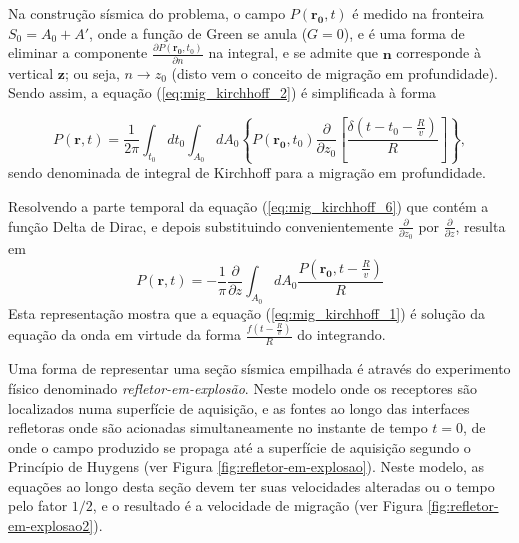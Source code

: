 Na construção sísmica do problema, o campo $P(\mathbf{r_0},t)$ é medido na fronteira $S_0 = A_0 + A'$, onde a função de Green se anula ($G = 0$), e é uma forma de eliminar a componente $\frac{\partial P(\mathbf{r_0},t_0)}{\partial n}$ na integral, e se admite que $\mathbf{n}$ corresponde à vertical $\mathbf{z}$; ou seja, $n\rightarrow z_0$ (disto vem o conceito de migração em profundidade). 
Sendo assim, a equação (\ref{eq:mig_kirchhoff_2}) é simplificada à forma

\begin{equation}
P(\mathbf{r},t)=\frac{1}{2\pi}\int_{t_0}dt_0\int_{A_0}dA_0\left\{P(\mathbf{r_0},t_0)\frac{\partial}{\partial z_0}\left[\frac{\delta (t-t_0-\frac{R}{v})}{R} \right]\right\},
\label{eq:mig_kirchhoff_6}
\end{equation}
sendo denominada de integral de Kirchhoff para a migração em profundidade. 

Resolvendo a parte temporal da equação (\ref{eq:mig_kirchhoff_6}) que contém a função Delta de Dirac, e depois substituindo convenientemente $\frac{\partial}{\partial z_0}$ por $\frac{\partial}{\partial z}$,  resulta em
\begin{equation}
P(\mathbf{r},t)=-\frac{1}{\pi}\frac{\partial}{\partial z}\int_{A_0}dA_0\frac{P(\mathbf{r_0},t-\frac{R}{v})}{R}
\label{eq:mig_kirchhoff_7}
\end{equation}
Esta representação mostra que a equação (\ref{eq:mig_kirchhoff_1}) é solução da equação da onda em virtude da forma $\frac{f(t-\frac{R}{v})}{R}$ do integrando.

Uma forma de representar uma seção sísmica empilhada é através do experimento físico denominado \textit{refletor-em-explosão}. 
Neste modelo onde os receptores são localizados numa superfície de aquisição, e as fontes ao longo das interfaces refletoras onde são acionadas simultaneamente no instante de tempo $t=0$, de onde o campo produzido se propaga até a superfície de aquisição segundo o Princípio de Huygens (ver Figura \ref{fig:refletor-em-explosao}).
Neste modelo, as equações ao longo desta seção devem ter suas velocidades alteradas ou o tempo pelo fator $1/2$, e o resultado é a velocidade de migração (ver Figura \ref{fig:refletor-em-explosao2}).

